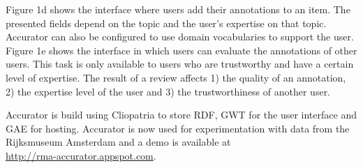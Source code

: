 Figure 1d shows the interface where users add their annotations to an item. The presented fields depend on the topic and the user's expertise on that topic. 
Accurator can also be configured to use domain vocabularies to support the user. Figure 1e shows the interface in which users can evaluate the annotations of other users. This task is only available to users who are trustworthy and have a certain level of expertise. The result of a review affects 1) the quality of an annotation, 2) the expertise level of the user and 3) the trustworthiness of another user.


Accurator is build using Cliopatria to store RDF, GWT for the user interface and GAE for hosting. Accurator is now used for experimentation with data from the Rijksmuseum Amsterdam and a demo is available at 
\\ \url{http://rma-accurator.appspot.com}.



